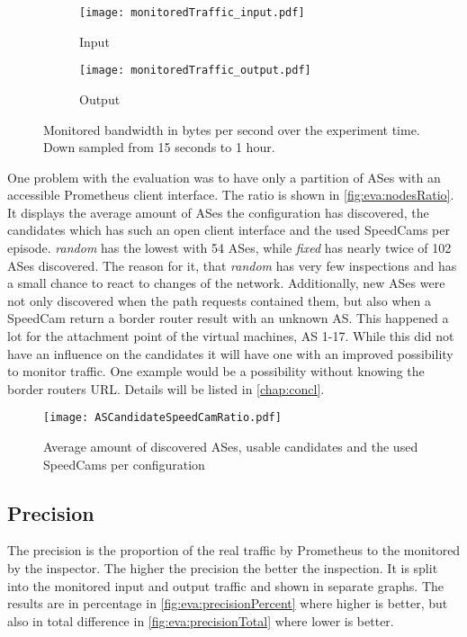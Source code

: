 \documentclass[thesis.tex]{subfiles}
\begin{document}
\begin{figure}[h]
	\centering
	\begin{subfigure}{.8\linewidth}
		\centering
		\texttt{[image: monitoredTraffic\_input.pdf]}
		\caption{Input}
		\label{fig:eva:monitoredTraffic:input}
	\end{subfigure}
	\hfill
	\begin{subfigure}{0.8\linewidth}
		\centering
		\texttt{[image: monitoredTraffic\_output.pdf]}
		\caption{Output}
		\label{fig:eva:monitoredTraffic:output}
	\end{subfigure}
	\caption{Monitored bandwidth in bytes per second over the experiment time. Down sampled from 15 seconds to 1 hour.}
	\label{fig:eva:monitoredTraffic}
\end{figure}

One problem with the evaluation was to have only a partition of ASes with an accessible Prometheus client interface. The ratio is shown in \autoref{fig:eva:nodesRatio}. It displays the average amount of ASes the configuration has discovered, the candidates which has such an open client interface and the used SpeedCams per episode. \textit{random} has the lowest with 54 ASes, while \textit{fixed} has nearly twice of 102 ASes discovered. The reason for it, that \textit{random} has very few inspections and has a small chance to react to changes of the network. Additionally, new ASes were not only discovered when the path requests contained them, but also when a SpeedCam return a border router result with an unknown AS. This happened a lot for the attachment point of the virtual machines, AS 1-17. While this did not have an influence on the candidates it will have one with an improved possibility to monitor traffic. One example would be a possibility without knowing the border routers URL. Details will be listed in \autoref{chap:concl}.

\begin{figure}[h]
	\centering
	\texttt{[image: ASCandidateSpeedCamRatio.pdf]}
	\caption{Average amount of discovered ASes, usable candidates and the used SpeedCams per configuration}
	\label{fig:eva:nodesRatio}
\end{figure}

\subsection{Precision} \label{sec:eva:precision}

The precision is the proportion of the real traffic by Prometheus to the monitored by the inspector. The higher the precision the better the inspection. It is split into the monitored input and output traffic and shown in separate graphs. The results are in percentage in \autoref{fig:eva:precisionPercent} where higher is better, but also in total difference in \autoref{fig:eva:precisionTotal} where lower is better.
\end{document}
